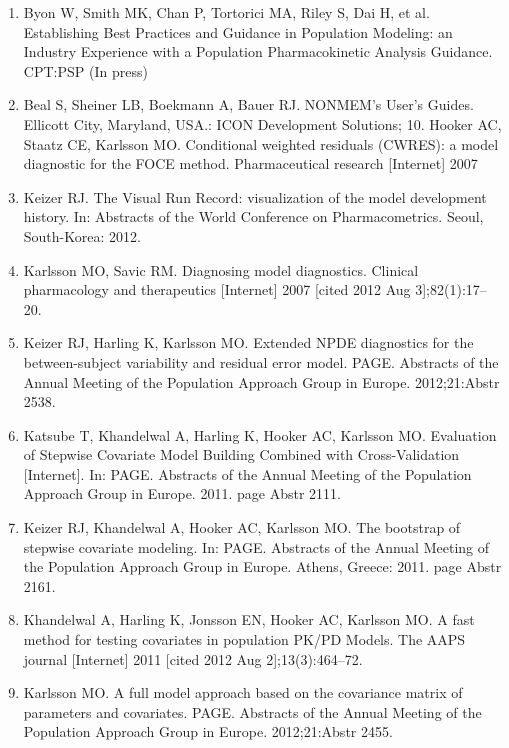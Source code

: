 \begin{enumerate}
\item Byon W, Smith MK, Chan P, Tortorici MA, Riley S, Dai H, et
  al. Establishing Best Practices and Guidance in Population Modeling:
  an Industry Experience with a Population Pharmacokinetic Analysis
  Guidance. CPT:PSP (In press)

\item Beal S, Sheiner LB, Boekmann A, Bauer RJ. NONMEM’s User's
  Guides. Ellicott City, Maryland, USA.: ICON Development Solutions;
  10.  Hooker AC, Staatz CE, Karlsson MO. Conditional weighted
  residuals (CWRES): a model diagnostic for the FOCE
  method. Pharmaceutical research [Internet] 2007

\item Keizer RJ. The Visual Run Record: visualization of the model
  development history. In: Abstracts of the World Conference on
  Pharmacometrics. Seoul, South-Korea: 2012.

\item Karlsson MO, Savic RM. Diagnosing model diagnostics. Clinical
  pharmacology and therapeutics [Internet] 2007 [cited 2012 Aug
  3];82(1):17–20.

\item Keizer RJ, Harling K, Karlsson MO. Extended NPDE diagnostics for
  the between-subject variability and residual error
  model. PAGE. Abstracts of the Annual Meeting of the Population
  Approach Group in Europe. 2012;21:Abstr 2538.

\item Katsube T, Khandelwal A, Harling K, Hooker AC, Karlsson
  MO. Evaluation of Stepwise Covariate Model Building Combined with
  Cross-Validation [Internet]. In: PAGE. Abstracts of the Annual
  Meeting of the Population Approach Group in Europe. 2011. page Abstr
  2111.

\item Keizer RJ, Khandelwal A, Hooker AC, Karlsson MO. The bootstrap
  of stepwise covariate modeling. In: PAGE. Abstracts of the Annual
  Meeting of the Population Approach Group in Europe. Athens, Greece:
  2011. page Abstr 2161.

\item Khandelwal A, Harling K, Jonsson EN, Hooker AC, Karlsson MO. A
  fast method for testing covariates in population PK/PD Models. The
  AAPS journal [Internet] 2011 [cited 2012 Aug 2];13(3):464–72.

\item Karlsson MO. A full model approach based on the covariance
  matrix of parameters and covariates. PAGE. Abstracts of the Annual
  Meeting of the Population Approach Group in Europe. 2012;21:Abstr
  2455.


\end{enumerate}
